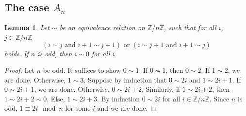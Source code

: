 \documentclass[a4paper]{amsart}
\theoremstyle{definition}
\theoremstyle{plain}
\newtheorem{lemma}[definition]{Lemma}
\newcommand{\ZZ}{\mathbb{Z}}
\begin{document}
\subsection{The case $A_n$}
\begin{lemma}\label{lem:odd_circle}
 Let $\sim$ be an equivalence relation on $\ZZ/n \ZZ$, such that for all $i$, $j \in \ZZ/n\ZZ$
 \[(i \sim j \mbox{ and } i+1\sim j+1) \mbox{ or }(i \sim j+1\mbox{ and } i+1 \sim j)\] 
 holds.
 If $n$ is odd, then $i\sim 0$ for all $i$.
\end{lemma}
\begin{proof}
Let $n$ be odd. It suffices to show $0 \sim 1$.
If $0 \not \sim 1$, then $0 \sim 2$. If $1 \sim 2$, we are done. Otherwise, $1 \sim 3$.
Suppose by induction that $0\sim 2i$ and $1 \sim 2i+1$. If $0\sim 2i+1$, we are done.
Otherwise, $0 \sim 2i+2$. Similarly, if $1 \sim 2i+2$, then $1 \sim 2i+2 \sim 0$. Else, $1\sim 2i+3$.
By induction $0 \sim 2i$ for all $i \in \ZZ/n\ZZ$. Since $n$ is odd, $1\equiv 2i \mod n$ for some $i$ and we are done.
\end{proof}
\end{document}
